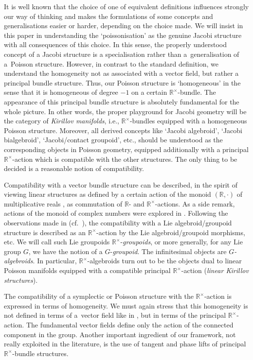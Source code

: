 \documentclass[10pt,a4paper]{amsart}
\newcommand{\R}{{\mathbb R}}
\newcommand{\ti}{\times}
\def\Rt{{\R^\times}}
\numberwithin{equation}{section}
\begin{document}
It is well known that the choice of one of equivalent def\/initions inf\/luences strongly our way of thinking and makes the formulations of some concepts and generalisations easier or harder, depending on the choice made. We will insist in this paper in understanding the `poissonisation' as the genuine Jacobi structure with all consequences of this choice. In this sense, the properly understood concept of a Jacobi structure is a specialisation rather than a~generalisation of a~Poisson structure. However, in contrast to the standard def\/inition, we understand the homogeneity not as associated with a vector f\/ield, but rather a principal bundle structure. Thus, our Poisson structure is `homogeneous' in the sense that it is homogeneous of degree $-1$ on a certain $\Rt$-bundle. The appearance of this principal bundle structure is absolutely fundamental for the whole picture. In other words, the proper playground for Jacobi geometry will be the category of \emph{Kirillov manifolds}, i.e., $\Rt$-bundles equipped with a homogeneous Poisson structure. Moreover, all derived concepts like `Jacobi algebroid', `Jacobi bialgebroid', `Jacobi/contact groupoid', etc., should be understood as the corresponding objects in Poisson geometry, equipped additionally with a principal $\R^\ti$-action which is compatible with the other structures. The only thing to be decided is a reasonable notion of compatibility.

Compatibility with a vector bundle structure can be described, in the spirit of viewing linear structures as def\/ined by a certain action of the monoid $(\R,\cdot)$ of multiplicative reals \cite{Grabowski:2006,Grabowski2012}, as commutation of $\R$- and $\R^\times$-actions. As a side remark, actions of the monoid of complex numbers were explored in \cite{Jozwikowski:2016}. Following the observations made in \cite{Bursztyn:2014} (cf.\ \cite{Bruce:2014c,Bruce:2014b, Bruce:2014}), the compatibility with a Lie algebroid/groupoid structure is described as an $\R^\ti$-action by the Lie algebroid/groupoid morphisms, etc. We will call such Lie groupoids $\mathbb{R}^{\times}$-\emph{groupoids}, or more generally, for any Lie group $G$, we have the notion of a $G$-\emph{groupoid}. The inf\/initesimal objects are \emph{$G$-algebroids}. In particular, $\Rt$-algebroids turn out to be the objects dual to linear Poisson manifolds equipped with a compatible principal $\Rt$-action (\emph{linear Kirillov structures}).

The compatibility of a symplectic or Poisson structure with the $\R^\ti$-action is expressed in terms of homogeneity. We must again stress that this homogeneity is not def\/ined in terms of a~vector f\/ield like in \cite{Crainic:2007,Libermann:1995,Marle:1991}, but in terms of the principal $\R^\ti$-action. The fundamental vector f\/ields def\/ine only the action of the connected component in the group. Another important ingredient of our framework, not really exploited in the literature, is the use of tangent and phase lifts of principal $\Rt$-bundle structures.
\end{document}
